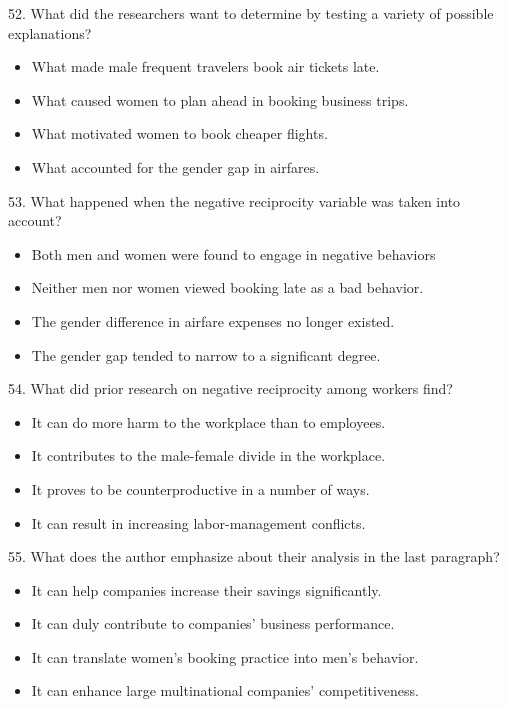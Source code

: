 \documentclass[UTF8,11pt]{ctexart}
\begin{document}
52. What did the researchers want to determine by testing a variety of possible explanations?


\begin{itemize}[leftmargin=2em,itemsep=.2em,topsep=.4em]\item[A.] What made male frequent travelers book air tickets late.
\item[B.] What caused women to plan ahead in booking business trips.
\item[C.] What motivated women to book cheaper flights.
\item[D.] What accounted for the gender gap in airfares.
\end{itemize}

53. What happened when the negative reciprocity variable was taken into account?


\begin{itemize}[leftmargin=2em,itemsep=.2em,topsep=.4em]\item[A.] Both men and women were found to engage in negative behaviors
\item[B.] Neither men nor women viewed booking late as a bad behavior.
\item[C.] The gender difference in airfare expenses no longer existed.
\item[D.] The gender gap tended to narrow to a significant degree.
\end{itemize}

54. What did prior research on negative reciprocity among workers find?


\begin{itemize}[leftmargin=2em,itemsep=.2em,topsep=.4em]\item[A.] It can do more harm to the workplace than to employees.
\item[B.] It contributes to the male-female divide in the workplace.
\item[C.] It proves to be counterproductive in a number of ways.
\item[D.] It can result in increasing labor-management conflicts.
\end{itemize}

55. What does the author emphasize about their analysis in the last paragraph?


\begin{itemize}[leftmargin=2em,itemsep=.2em,topsep=.4em]\item[A.] It can help companies increase their savings significantly.
\item[B.] It can duly contribute to companies’ business performance.
\item[C.] It can translate women’s booking practice into men’s behavior.
\item[D.] It can enhance large multinational companies’ competitiveness.
\end{itemize}
\end{document}
